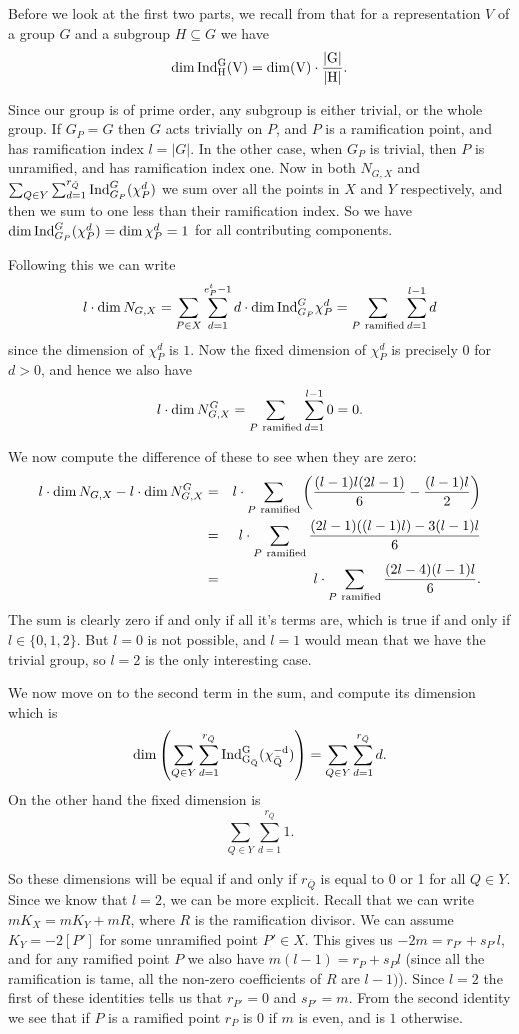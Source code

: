 \documentclass[11pt]{article} %
\theoremstyle{remark}\newtheorem*{rem}{Remark}
\begin{document}
Before we look at the first two parts, we recall from \citep[Rem. 4.30]{introtoreps} that for a representation $V$ of a group $G$ and a subgroup $H\subseteq G$ we have
\[
  \dim \rm{Ind}_H^G(V) = \dim(V)\cdot\frac{|G|}{|H|}.
\]

Since our group is of prime order, any subgroup is either trivial, or the whole group.
If $G_P = G$ then $G$ acts trivially on $P$, and $P$ is a ramification point, and has ramification index $l=|G|$.
In the other case, when $G_P$ is trivial, then $P$ is unramified, and has ramification index one.
Now in both $N_{G,X}$ and $\sum_{Q\in Y}\sum^{r_{\bar Q}}_{d=1} {\rm Ind}_{G_P}^G(\chi_P^d)$ we sum over all the points in $X$ and $Y$ respectively, and then we sum to one less than their ramification index.
So we have $\dim {\rm Ind}_{G_P}^G(\chi_P^d) = \dim \chi_P^d = 1$ for all contributing components.

Following this we can write 
\[
 l\cdot \dim N_{G,X} = \sum_{P\in X} \sum_{d=1}^{e^t_P -1} d\cdot \dim {\rm Ind}_{G_P}^G\chi_P^d = \sum_{P\ \rm{ ramified}} \sum_{d=1}^{l -1} d
\]
since the dimension of $\chi^d_P$ is $1$.
Now the fixed dimension of $\chi^d_P$ is precisely 0 for $d>0$, and hence we also have
\[
 l\cdot \dim N_{G,X}^G = \sum_{P\ \rm{ ramified}} \sum_{d=1}^{l-1} 0 = 0.
\]

We now compute the difference of these to see when they are zero:
\begin{eqnarray*}
 l\cdot \dim N_{G,X} - l\cdot \dim N_{G,X}^G & = & l\cdot \sum_{P\ \rm{ ramified}} \left( \frac{(l-1)l(2l-1)}{6} - \frac{(l-1)l}{2}\right) \\
  & = & l\cdot \sum_{P\ \rm{ ramified}} \frac{(2l-1)((l-1)l) - 3(l-1)l}{6}\\
  & = & l\cdot \sum_{P\ \rm{ ramified}} \frac{(2l-4)(l-1)l}{6}.
\end{eqnarray*}
The sum is clearly zero if and only if all it's terms are, which is true if and only if $l\in \{0,1,2\}$.
But $l=0$ is not possible, and $l=1$ would mean that we have the trivial group, so $l=2$ is the only interesting case.

We now move on to the second term in the sum, and compute its dimension which is
\[
 \dim \left(\sum_{Q\in Y} \sum_{d=1}^{r_{\bar Q}} \rm{Ind}_{G_{\bar Q}}^G (\chi_{\bar Q}^{-d})\right) = \sum_{Q\in Y} \sum_{d=1}^{r_{\bar Q}} d.
\]
On the other hand the fixed dimension is
\[
 \sum_{Q\in Y} \sum_{d=1}^{r_{\bar Q}} 1.
\]

So these dimensions will be equal if and only if $r_{\bar Q}$ is equal to 0 or 1 for all $Q \in Y$.
Since we know that $l=2$, we can be more explicit.
Recall that we can write $mK_X = mK_Y + mR$, where $R$ is the ramification divisor.
We can assume $K_Y = -2[P']$ for some unramified point $P'\in X$.
This gives us $-2m = r_{P'} + s_{P'}l$, and for any ramified point $P$ we also have $m(l-1) = r_P + s_Pl$ (since all the ramification is tame, all the non-zero coefficients of $R$ are $l-1)$).
Since $l=2$ the first of these identities tells us that $r_{P'}=0$ and $s_{P'}=m$.
From the second identity we see that if $P$ is a ramified point $r_P$ is $0$ if $m$ is even, and is $1$ otherwise.
\end{document}
